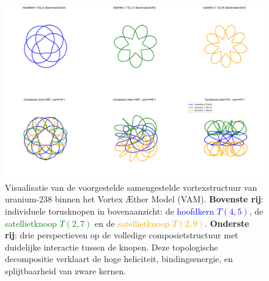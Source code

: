 \begin{figure}[H]
    \centering
    \includegraphics[width=\textwidth]{sections/0_UraniumKnoop}
    \caption[Samengestelde vortexstructuur van uranium-238 in VAM]{
        Visualisatie van de voorgestelde samengestelde vortexstructuur van uranium-238 binnen het Vortex \AE ther Model (VAM).
        \textbf{Bovenste rij}: individuele torusknopen in bovenaanzicht:
        de \textcolor{blue}{hoofdkern \(T(4,5)\)}, de \textcolor{green}{satellietknoop \(T(2,7)\)} en de \textcolor{orange}{satellietknoop \(T(2,9)\)}.
        \textbf{Onderste rij}: drie perspectieven op de volledige composietstructuur met duidelijke interactie tussen de knopen.
        Deze topologische decompositie verklaart de hoge heliciteit, bindingsenergie, en splijtbaarheid van zware kernen.
    }
    \label{fig:uranium_2x3}
\end{figure}

